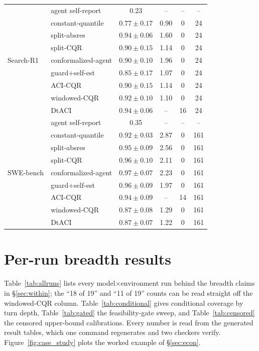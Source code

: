 \documentclass{article}
\begin{document}
\begin{table}[t]
\begin{tabular}{@{}llcccc@{}}
\midrule
\multirow{9}{*}{Search-R1}
 & agent self-report & 0.23 & -- & -- & -- \\
 & constant-quantile & $0.77\pm0.17$ & 0.90 & 0 & 24 \\
 & split-absres & $0.94\pm0.06$ & 1.60 & 0 & 24 \\
 & split-CQR & $0.90\pm0.15$ & 1.14 & 0 & 24 \\
 & conformalized-agent & $0.90\pm0.10$ & 1.96 & 0 & 24 \\
 & guard+self-est & $0.85\pm0.17$ & 1.07 & 0 & 24 \\
 & ACI-CQR & $0.90\pm0.15$ & 1.14 & 0 & 24 \\
 & windowed-CQR & $0.92\pm0.10$ & 1.10 & 0 & 24 \\
 & DtACI & $0.94\pm0.06$ & -- & 16 & 24 \\
\midrule
\multirow{9}{*}{SWE-bench}
 & agent self-report & 0.35 & -- & -- & -- \\
 & constant-quantile & $0.92\pm0.03$ & 2.87 & 0 & 161 \\
 & split-absres & $0.95\pm0.09$ & 2.56 & 0 & 161 \\
 & split-CQR & $0.96\pm0.10$ & 2.11 & 0 & 161 \\
 & conformalized-agent & $0.97\pm0.07$ & 2.23 & 0 & 161 \\
 & guard+self-est & $0.96\pm0.09$ & 1.97 & 0 & 161 \\
 & ACI-CQR & $0.94\pm0.09$ & -- & 14 & 161 \\
 & windowed-CQR & $0.87\pm0.08$ & 1.29 & 0 & 161 \\
 & DtACI & $0.87\pm0.07$ & 1.22 & 0 & 161 \\
\bottomrule
\end{tabular}
\end{table}

\section{Per-run breadth results}
\label{app:breadth}

Table~\ref{tab:allruns} lists every model$\times$environment run behind the breadth claims in \S\ref{sec:within}; the ``18 of 19'' and ``11 of 19'' counts can be read straight off the windowed-CQR column. Table~\ref{tab:conditional} gives conditional coverage by turn depth, Table~\ref{tab:gated} the feasibility-gate sweep, and Table~\ref{tab:censored} the censored upper-bound calibrations. Every number is read from the generated result tables, which one command regenerates and two checkers verify. Figure~\ref{fig:case_study} plots the worked example of \S\ref{sec:econ}.
\end{document}
